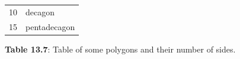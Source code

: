 \begin{table}[H]
{{\begin{center}
\begin{tabular}[t]{|l|l|}
    
        10 &
    
    
        decagon%
     \tabularnewline\cline{1-1}\cline{2-2}
    
    
        15 &
    
    
        pentadecagon%
     \tabularnewline\cline{1-1}\cline{2-2}
    \end{tabular}
      \end{center}
    \begin{center}{\small\bfseries Table 13.7}: Table of some polygons and their
number of sides.\end{center}
    
    \addtocounter{footnote}{-0}
    
          }{ %
        
    
        \begin{center}
      
      \label{m38380*uid92}
      
    \noindent
      \tablelasttail{}
      \begin{xtabular}[t]{|l|l|}\hline
    

\end{xtabular}
\end{center}}}
\end{table}
